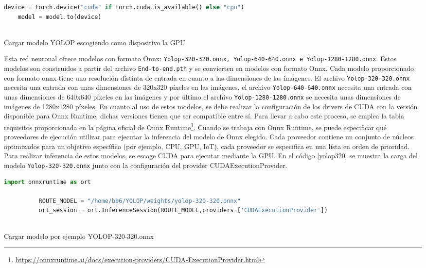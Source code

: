   
\begin{code}[h]
    \begin{lstlisting}[language=Python]
    device = torch.device("cuda" if torch.cuda.is_available() else "cpu")
    model = model.to(device)
  
    \end{lstlisting}
    \caption[Cargar modelo YOLOP escogiendo como dispositivo la GPU]{Cargar modelo YOLOP escogiendo como dispositivo la GPU}
    \label{cod:codeloadYOLOP}
    \end{code}  

      Esta red neuronal ofrece modelos con formato Onnx: \texttt{Yolop-320-320.onnx, Yolop-640-640.onnx e Yolop-1280-1280.onnx}. Estos modelos son construidos a partir del archivo 
      \texttt{End-to-end.pth} y se convierten en modelos con formato Onnx. Cada modelo proporcionado con formato onnx tiene una resolución distinta de entrada en cuanto a las dimensiones
      de las imágenes. El archivo \texttt{Yolop-320-320.onnx} necesita una entrada con unas dimensiones de 320x320 píxeles en las imágenes, el archivo \texttt{Yolop-640-640.onnx} necesita 
      una entrada con unas dimensiones de 640x640 píxeles en las imágenes y por último el archivo \texttt{Yolop-1280-1280.onnx} se necesita unas dimensiones de imágenes de 1280x1280 píxeles. 
      En cuanto al uso de estos modelos, se debe realizar la configuración de los drivers de CUDA con la versión disponible para Onnx Runtime, 
      dichas versiones tienen que ser compatible entre sí. Para llevar a cabo este proceso, se emplea la tabla requisitos proporcionada en la página oficial de Onnx Runtime\footnote{\url{https://onnxruntime.ai/docs/execution-providers/CUDA-ExecutionProvider.html}}. \newline
      Cuando se trabaja con Onnx Runtime, se puede especificar qué proveedores de ejecución utilizar para ejecutar la inferencia del modelo de Onnx elegido. Cada proveedor 
      contiene un conjunto de núcleos optimizados para un objetivo específico (por ejemplo, CPU, GPU, IoT), cada proveedor se especifica en una lista en orden de prioridad. Para realizar 
      inferencia de estos modelos, se escoge CUDA para ejecutar mediante la GPU. En el código \ref{yolop320} se muestra la carga del modelo \texttt{Yolop-320-320.onnx} junto con la configuración
      del provider CUDAExecutionProvider. 
      
      \begin{code}[h]
        \begin{lstlisting}[language=Python]
          import onnxruntime as ort

          ROUTE_MODEL = "/home/bb6/YOLOP/weights/yolop-320-320.onnx"
          ort_session = ort.InferenceSession(ROUTE_MODEL,providers=['CUDAExecutionProvider'])
      
        \end{lstlisting}
        \caption[Cargar modelo]{Cargar modelo por ejemplo YOLOP-320-320.onnx}
        \label{yolop320}
        \end{code}  

